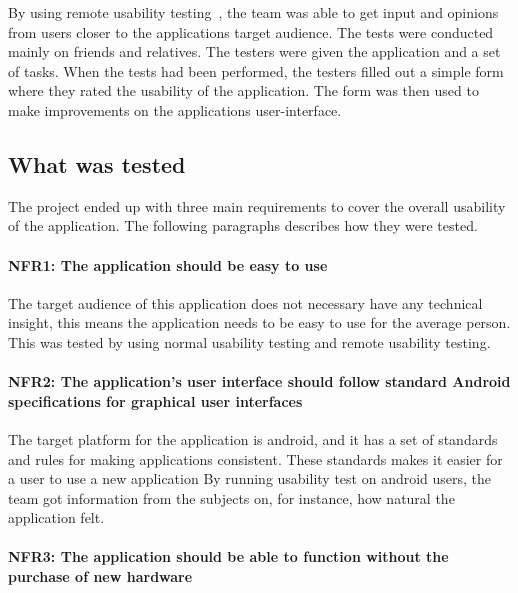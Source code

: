 
By using remote usability testing~\cite{remoteTest}, the team was able to get input and opinions from users closer to the applications target audience.
The tests were conducted mainly on friends and relatives. The testers were given the application and a set of tasks. When the tests had been performed, the testers filled out a simple form where they rated the usability of the application. The form was then used to make improvements on the applications user-interface.

\subsection{What was tested}
The project ended up with three main requirements to cover the overall usability of the application. The following paragraphs describes how they were tested.

\paragraph{NFR1: The application should be easy to use}
The target audience of this application does not necessary have any technical insight, this means the application needs to be easy to use for the average person. This was tested by using normal usability testing and remote usability testing.

\paragraph{NFR2: The application's user interface should follow standard Android specifications for graphical user interfaces}
The target platform for the application is android, and it has a set of standards and rules for making applications consistent. These standards makes it easier for a user to use a new application 
By running usability test on android users, the team got information from the subjects on, for instance, how natural the application felt.

\paragraph{NFR3: The application should be able to function without the purchase of new hardware}


